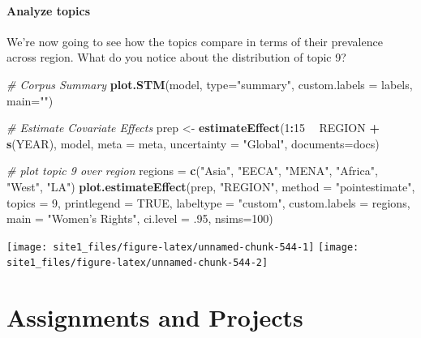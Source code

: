 \documentclass[]{book}
\newenvironment{Shaded}{\begin{snugshade}}{\end{snugshade}}
\newcommand{\CommentTok}[1]{\textcolor[rgb]{0.56,0.35,0.01}{\textit{#1}}}
\newcommand{\DataTypeTok}[1]{\textcolor[rgb]{0.13,0.29,0.53}{#1}}
\newcommand{\DecValTok}[1]{\textcolor[rgb]{0.00,0.00,0.81}{#1}}
\newcommand{\FloatTok}[1]{\textcolor[rgb]{0.00,0.00,0.81}{#1}}
\newcommand{\KeywordTok}[1]{\textcolor[rgb]{0.13,0.29,0.53}{\textbf{#1}}}
\newcommand{\NormalTok}[1]{#1}
\newcommand{\OperatorTok}[1]{\textcolor[rgb]{0.81,0.36,0.00}{\textbf{#1}}}
\newcommand{\OtherTok}[1]{\textcolor[rgb]{0.56,0.35,0.01}{#1}}
\newcommand{\StringTok}[1]{\textcolor[rgb]{0.31,0.60,0.02}{#1}}
\begin{document}
\hypertarget{analyze-topics}{%
\subsection{Analyze topics}\label{analyze-topics}}

We're now going to see how the topics compare in terms of their prevalence across region. What do you notice about the distribution of topic 9?

\begin{Shaded}
\begin{Highlighting}[]
\CommentTok{# Corpus Summary}
\KeywordTok{plot.STM}\NormalTok{(model, }\DataTypeTok{type=}\StringTok{"summary"}\NormalTok{, }\DataTypeTok{custom.labels =}\NormalTok{ labels, }\DataTypeTok{main=}\StringTok{""}\NormalTok{)}

\CommentTok{# Estimate Covariate Effects}
\NormalTok{prep <-}\StringTok{ }\KeywordTok{estimateEffect}\NormalTok{(}\DecValTok{1}\OperatorTok{:}\DecValTok{15} \OperatorTok{~}\StringTok{ }\NormalTok{REGION }\OperatorTok{+}\StringTok{ }\KeywordTok{s}\NormalTok{(YEAR), model, }\DataTypeTok{meta =}\NormalTok{ meta, }\DataTypeTok{uncertainty =} \StringTok{"Global"}\NormalTok{, }\DataTypeTok{documents=}\NormalTok{docs)}

\CommentTok{# plot topic 9 over region}
\NormalTok{regions =}\StringTok{ }\KeywordTok{c}\NormalTok{(}\StringTok{"Asia"}\NormalTok{, }\StringTok{"EECA"}\NormalTok{, }\StringTok{"MENA"}\NormalTok{, }\StringTok{"Africa"}\NormalTok{, }\StringTok{"West"}\NormalTok{, }\StringTok{"LA"}\NormalTok{)}
\KeywordTok{plot.estimateEffect}\NormalTok{(prep, }\StringTok{"REGION"}\NormalTok{, }\DataTypeTok{method =} \StringTok{"pointestimate"}\NormalTok{, }\DataTypeTok{topics =} \DecValTok{9}\NormalTok{, }\DataTypeTok{printlegend =} \OtherTok{TRUE}\NormalTok{, }\DataTypeTok{labeltype =} \StringTok{"custom"}\NormalTok{, }\DataTypeTok{custom.labels =}\NormalTok{ regions, }\DataTypeTok{main =} \StringTok{"Women's Rights"}\NormalTok{, }\DataTypeTok{ci.level =} \FloatTok{.95}\NormalTok{, }\DataTypeTok{nsims=}\DecValTok{100}\NormalTok{)}
\end{Highlighting}
\end{Shaded}

\begin{center}\texttt{[image: site1\_files/figure-latex/unnamed-chunk-544-1]} \texttt{[image: site1\_files/figure-latex/unnamed-chunk-544-2]} \end{center}

\hypertarget{part-assignments-and-projects}{%
\part{Assignments and Projects}\label{part-assignments-and-projects}}
\end{document}
